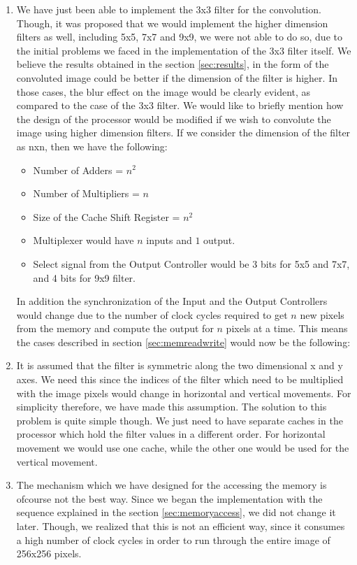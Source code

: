 \documentclass[11pt,a4paper]{article}
\begin{document}
\begin{enumerate}
\item We have just been able to implement the 3x3 filter for the convolution. Though, it was proposed that we would implement the higher dimension filters as well, including 5x5, 7x7 and 9x9, we were not able to do so, due to the initial problems we faced in the implementation of the 3x3 filter itself. We believe the results obtained in the section \ref{sec:results}, in the form of the convoluted image could be better if the dimension of the filter is higher. In those cases, the blur effect on the image would be clearly evident, as compared to the case of the 3x3 filter. We would like to briefly mention how the design of the processor would be modified if we wish to convolute the image using higher dimension filters. If we consider the dimension of the filter as nxn, then we have the following:
	\begin{itemize}
		\item Number of Adders = $n^2$
		\item Number of Multipliers = $n$
		\item Size of the Cache Shift Register = $n^2$
		\item Multiplexer would have $n$ inputs and $1$ output.
		\item Select signal from the Output Controller would be 3 bits for 5x5 and 7x7, and 4 bits for 9x9 filter.
	\end{itemize}	
	
	In addition the synchronization of the Input and the Output Controllers would change due to the number of clock cycles required to get $n$ new pixels from the memory and compute the output for $n$ pixels at a time. This means the cases described in section \ref{sec:memreadwrite} would now be the following:
	
	
\item It is assumed that the filter is symmetric along the two dimensional x and y axes. We need this since the indices of the filter which need to be multiplied with the image pixels would change in horizontal and vertical movements. For simplicity therefore, we have made this assumption.
The solution to this problem is quite simple though. We just need to have separate caches in the processor which hold the filter values in a different order. For horizontal movement we would use one cache, while the other one would be used for the vertical movement.

\item The mechanism which we have designed for the accessing the memory is ofcourse not the best way. Since we began the implementation with the sequence explained in the section \ref{sec:memoryaccess}, we did not change it later. Though, we realized that this is not an efficient way, since it consumes a high number of clock cycles in order to run through the entire image of 256x256 pixels.
\end{enumerate}	
\end{document}
